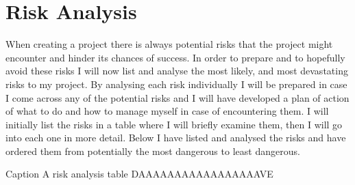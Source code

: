 \documentclass{article}
\begin{document}
\section{Risk Analysis}
When creating a project there is always potential risks that the project might encounter and hinder its chances of success. 
In order to prepare and to hopefully avoid these risks I will now list and analyse the most likely, and most devastating risks to my project. 
By analysing each risk individually I will be prepared in case I come across any of the potential risks and I will have developed a plan of action of what to do and how to manage myself in case of encountering them. 
I will initially list the risks in a table where I will briefly examine them, then I will go into each one in more detail. 
Below I have listed and analysed the risks and have ordered them from potentially the most dangerous to least dangerous. 

Caption A risk analysis table
DAAAAAAAAAAAAAAAAAVE

\end{document}
